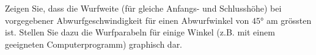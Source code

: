 Zeigen Sie, dass die Wurfweite (für gleiche Anfangs- und Schlusshöhe) bei vorgegebener Abwurfgeschwindigkeit für einen Abwurfwinkel von $\ang{45}$ am grössten ist. Stellen Sie dazu die Wurfparabeln für einige Winkel (z.B. mit einem geeigneten Computerprogramm) graphisch dar.
